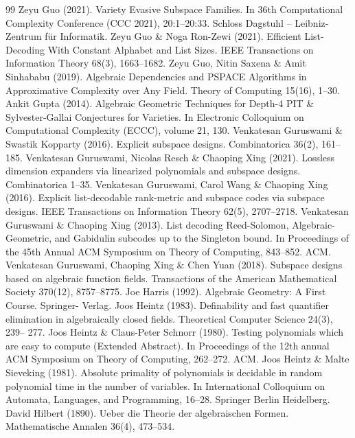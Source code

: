 \documentclass[10pt,a4paper]{article}
\begin{document}
\begin{thebibliography}{99}
 Zeyu Guo (2021). Variety Evasive Subspace Families. In 36th Computational Complexity Conference (CCC 2021), 20:1–20:33. Schloss Dagstuhl – Leibniz-Zentrum für Informatik.
 Zeyu Guo \& Noga Ron-Zewi (2021). Efficient List-Decoding With Constant Alphabet and List Sizes. IEEE Transactions on Information Theory 68(3), 1663–1682.
 Zeyu Guo, Nitin Saxena \& Amit Sinhababu (2019). Algebraic Dependencies and PSPACE Algorithms in Approximative Complexity over Any Field. Theory of Computing 15(16), 1–30.
 Ankit Gupta (2014). Algebraic Geometric Techniques for Depth-4 PIT \& Sylvester-Gallai Conjectures for Varieties. In Electronic Colloquium on Computational Complexity (ECCC), volume 21, 130.
 Venkatesan Guruswami \& Swastik Kopparty (2016). Explicit subspace designs. Combinatorica 36(2), 161–185.
 Venkatesan Guruswami, Nicolas Resch \& Chaoping Xing (2021). Lossless dimension expanders via linearized polynomials and subspace designs. Combinatorica 1–35.
 Venkatesan Guruswami, Carol Wang \& Chaoping Xing (2016). Explicit list-decodable rank-metric and subspace codes via subspace designs. IEEE Transactions on Information Theory 62(5), 2707–2718.
 Venkatesan Guruswami \& Chaoping Xing (2013). List decoding Reed-Solomon, Algebraic-Geometric, and Gabidulin subcodes up to the Singleton bound. In Proceedings of the 45th Annual ACM Symposium on Theory of Computing, 843–852. ACM.
 Venkatesan Guruswami, Chaoping Xing \& Chen Yuan (2018). Subspace designs based on algebraic function fields. Transactions of the American Mathematical Society 370(12), 8757–8775.
 Joe Harris (1992). Algebraic Geometry: A First Course. Springer- Verlag.
 Joos Heintz (1983). Definability and fast quantifier elimination in algebraically closed fields. Theoretical Computer Science 24(3), 239– 277.
 Joos Heintz \& Claus-Peter Schnorr (1980). Testing polynomials which are easy to compute (Extended Abstract). In Proceedings of the 12th annual ACM Symposium on Theory of Computing, 262–272. ACM.
 Joos Heintz \& Malte Sieveking (1981). Absolute primality of polynomials is decidable in random polynomial time in the number of variables. In International Colloquium on Automata, Languages, and Programming, 16–28. Springer Berlin Heidelberg.
 David Hilbert (1890). Ueber die Theorie der algebraischen Formen. Mathematische Annalen 36(4), 473–534.

\end{thebibliography}
\end{document}
